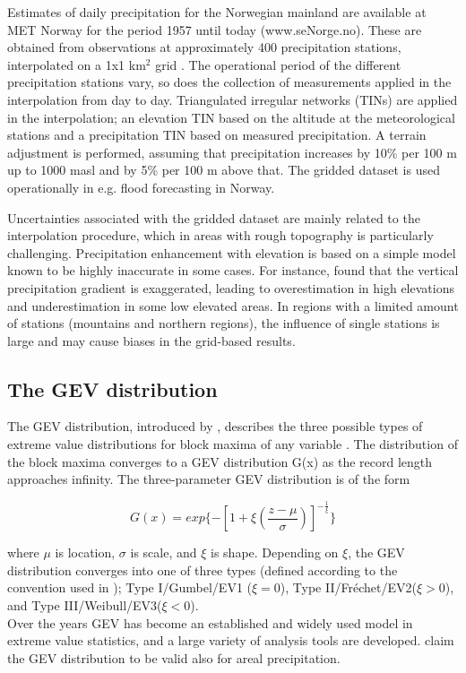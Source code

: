 \documentclass[12pt,a4paper,english]{article}
\begin{document}
Estimates of daily precipitation for the Norwegian mainland are available at MET Norway for the period 1957 until today (www.seNorge.no). These are obtained from observations at approximately 400 precipitation stations, interpolated on a 1x1 km$^2$ grid \citep{Tveitoetal2005, Mohr2009, Janssonetal2007}. The operational period of the different precipitation stations vary, so does the collection of measurements applied in the interpolation from day to day. Triangulated irregular networks (TINs) are applied in the interpolation; an elevation TIN based on the altitude at the meteorological stations and a precipitation TIN based on measured precipitation. A terrain adjustment is performed, assuming that precipitation increases by 10\% per 100 m up to 1000 masl and by 5\% per 100 m above that. The gridded dataset is used operationally in e.g. flood forecasting in Norway.  

Uncertainties associated with the gridded dataset are mainly related to the interpolation procedure, which in areas with rough topography is particularly challenging. Precipitation enhancement with elevation is based on a simple model known to be highly inaccurate in some cases. For instance, \cite{Engesetetal2004b, Saloranta2012} found that the vertical precipitation gradient is exaggerated, leading to overestimation in high elevations and underestimation in some low elevated areas. In regions with a limited amount of stations (mountains and northern regions), the influence of single stations is large and may cause biases in the grid-based results.\\
 

\subsection{The GEV distribution}

The GEV distribution, introduced by \cite{Jenkinson1955}, describes the three possible types of extreme value distributions for block maxima of any variable \citep{Coles2001}. The distribution of the block maxima converges to a GEV distribution G(x) as the record length approaches infinity. The three-parameter GEV distribution is of the form 

\begin{equation}
G(x) = exp\{ - [1 + \xi(\frac{z - \mu}{\sigma})]^{-\frac{1}{\xi}}\}  
\end{equation}

\noindent where $\mu$ is location, $\sigma$ is scale, and $\xi$ is shape. Depending on $\xi$, the GEV distribution converges into one of three types (defined according to the convention used in \cite{Coles2001}); Type I/Gumbel/EV1 ($\xi=0$), Type II/Fr\'echet/EV2($\xi>0$), and Type III/Weibull/EV3($\xi<0$). \\
Over the years GEV has become an established and widely used model in extreme value statistics, and a large variety of analysis tools are developed. \cite{ColesandTawn1996} claim the GEV distribution to be valid also for areal precipitation. 
\end{document}
